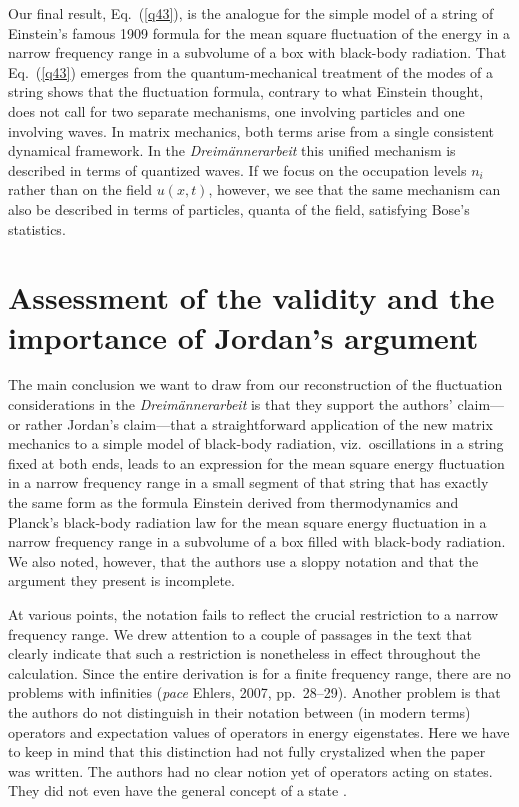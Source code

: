 \documentclass[12pt]{elsart}
\begin{document}
{Our final result, Eq.\ (\ref{q43}), is the analogue for the simple model of a string of Einstein's famous 1909 formula for the mean square fluctuation of the energy in a narrow frequency range in a subvolume of a box with black-body radiation. That Eq.\ (\ref{q43}) emerges from the quantum-mechanical treatment of the modes of a string shows that the fluctuation formula, contrary to what Einstein thought, does not call for two separate mechanisms, one involving particles and one involving waves. In matrix mechanics, both terms arise from a single consistent dynamical framework. In the {\it Dreim\"annerarbeit} this unified mechanism is described in terms of quantized waves. If we focus on the occupation levels $n_i$ rather than on the field $u(x,t)$, however, we see that the same mechanism can also be described in terms of particles, quanta of the field, satisfying Bose's statistics. 

\section{Assessment of the validity and the importance of Jordan's argument}

The main conclusion we want to draw from our reconstruction of the fluctuation considerations in the {\it Dreim\"annerarbeit} is that they support the authors' claim---or rather Jordan's claim---that a straightforward application of the new matrix mechanics to a simple model of black-body radiation, viz.\ oscillations in a string fixed at both ends, leads to an expression for the mean square energy fluctuation in a narrow frequency range in a small segment of that string that has exactly the same form as the formula Einstein derived from thermodynamics and Planck's black-body radiation law for the mean square energy fluctuation in a narrow frequency range in a subvolume of a box filled with black-body radiation. We also noted, however, that the authors use a sloppy notation and that the argument they present is incomplete. 

At various points, the notation fails to reflect the crucial restriction to a narrow frequency range. We drew attention to a couple of passages in the text that clearly indicate that such a restriction is nonetheless in effect throughout the calculation. Since the entire derivation is for a finite frequency range, there are no problems with infinities ({\it pace} Ehlers,  2007, pp.\ 28--29). Another problem is that the authors do not distinguish in their notation between (in modern terms) operators and expectation values of operators in energy eigenstates. Here we have to keep in mind that this distinction had not fully crystalized when the paper was written. The authors had no clear notion yet of operators acting on states. They did not even have the general concept of a state \citep[sec.\ 3]{Duncan and Janssen}. 


}
\end{document}
